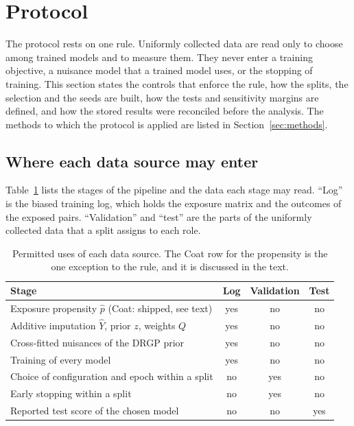 \section{Protocol}\label{sec:protocol}

The protocol rests on one rule. Uniformly collected data are read only to choose among trained models
and to measure them. They never enter a training objective, a nuisance model that a trained model uses,
or the stopping of training. This section states the controls that enforce the rule, how the splits,
the selection and the seeds are built, how the tests and sensitivity margins are defined, and how the
stored results were reconciled before the analysis. The methods to which the protocol is applied are
listed in Section~\ref{sec:methods}.

\subsection{Where each data source may enter}\label{sec:leakage}

Table~\ref{tab:leakage} lists the stages of the pipeline and the data each stage may read. ``Log'' is the
biased training log, which holds the exposure matrix and the outcomes of the exposed pairs.
``Validation'' and ``test'' are the parts of the uniformly collected data that a split assigns to each role.

\begin{table}[htbp]\centering\footnotesize
\caption{Permitted uses of each data source. The Coat row for the propensity is the one exception to the
rule, and it is discussed in the text.}\label{tab:leakage}
\begin{tabular}{lccc}
\toprule
Stage & Log & Validation & Test \\
\midrule
Exposure propensity $\hat p$ (Coat: shipped, see text) & yes & no & no \\
Additive imputation $\hat Y$, prior $z$, weights $Q$ & yes & no & no \\
Cross-fitted nuisances of the DRGP prior & yes & no & no \\
Training of every model & yes & no & no \\
Choice of configuration and epoch within a split & no & yes & no \\
Early stopping within a split & no & yes & no \\
Reported test score of the chosen model & no & no & yes \\
\bottomrule
\end{tabular}
\end{table}

